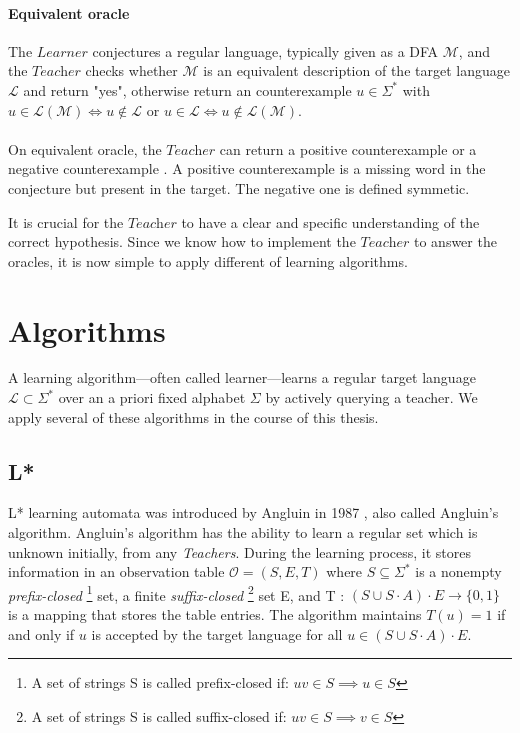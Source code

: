 \paragraph*{Equivalent oracle} 
The $\textit{Learner}$ conjectures a regular language, typically given as a DFA $\mathcal{M}$, 
and the $\textit{Teacher}$ checks whether $\mathcal{M}$ is an equivalent description of the target 
language $\mathcal{L}$ and return "yes", otherwise return an counterexample $u \in \Sigma^{*}$ with 
$u \in \mathcal{L}(\mathcal{M}) \Longleftrightarrow u \notin \mathcal{L}$ or 
$u \in \mathcal{L} \Longleftrightarrow u \notin \mathcal{L}(\mathcal{M})$.
\paragraph*{}
On equivalent oracle, the $\textit{Teacher}$ can return a positive counterexample or a negative counterexample \cite{chen2017learning}.
A positive counterexample is a missing word in the conjecture but present in the target.
The negative one is defined symmetic.

It is crucial for the $\textit{Teacher}$ to have a clear and specific understanding of the 
correct hypothesis.
Since we know how to implement the $\textit{Teacher}$ to answer the oracles, it is now simple 
to apply different of learning algorithms.
\section{Algorithms}\label{section:learner_learning}
A learning algorithm—often called learner—learns a regular target 
language $\mathcal{L} \subset \Sigma^{*}$ over an a priori fixed alphabet $\Sigma$ by actively querying a teacher.
We apply several of these algorithms in the course of this thesis.
\subsection{L*}
L* learning automata was introduced by Angluin in 1987 \cite{ANGLUIN198787},
also called Angluin's algorithm.
Angluin's algorithm has the ability to learn a 
regular set which is unknown initially, from any \textit{Teachers}.
During the learning process, it stores
information in an observation table 
$\mathcal{O} = (S, E, T)$ where $S \subseteq \Sigma^*$ is a nonempty
\textit{prefix-closed} \footnote{A set of strings S is called prefix-closed if: $uv \in S \implies u \in S$} set, 
a finite \textit{suffix-closed} \footnote{A set of strings S is called suffix-closed if: $uv \in S \implies v \in S$} set E,
and T : $(S \cup S \cdot A) \cdot E \rightarrow \lbrace 0, 1 \rbrace$ 
is a mapping that stores the table entries.
The algorithm maintains $T(u) = 1$ if and only if $u$ is accepted by the target language for all 
$u \in (S \cup S \cdot A) \cdot E$.

